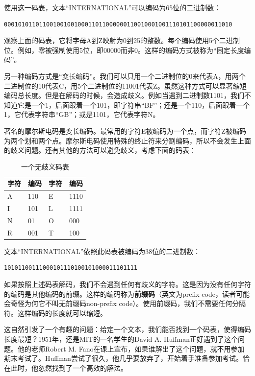 \documentclass[b5paper]{ctexart}
\begin{document}
使用这一码表，文本“INTERNATIONAL”可以编码为65位的二进制数：

\begin{Verbatim}[fontsize=\footnotesize]
00010101101100100100100011011000000110010001001110101100000011010
\end{Verbatim}

观察上面的码表，它将字母A到Z映射为0到25的整数。每个编码使用5个二进制位。例如，零被强制使用5位，即00000而非0。这样的编码方式被称为“固定长度编码”。

另一种编码方式是“变长编码”。我们可以只用一个二进制位的0来代表A，用两个二进制位的10代表C，用5个二进制位的11001代表Z。虽然这种方式可以显著缩短编码总长度。但是在解码的时候，会造成歧义。例如当遇到二进制数1101，我们不知道它是一个1，后面跟着一个101，即字符串“BF”；还是一个110，后面跟着一个1，它代表字符串“GB”；或是1101，它代表字符N。

著名的摩尔斯电码是变长编码。最常用的字符E被编码为一个点，而字符Z被编码为两个划和两个点。摩尔斯电码使用特殊的终止符来分割编码，所以不会发生上面的歧义问题。还有其他的方法可以避免歧义，考虑下面的码表：

\begin{table}[htbp]
\centering
\begin{tabular}{l|l||l|l}
字符 & 编码 & 字符 & 编码 \\
\hline
A & 110 & E & 1110 \\
I & 101 & L & 1111 \\
N & 01 & O & 000 \\
R & 001 & T & 100 \\
\hline
\end{tabular}
\caption{一个无歧义码表} \label{tab:example-prefix-code}
\end{table}

文本“INTERNATIONAL”依照此码表被编码为38位的二进制数：

\begin{Verbatim}[fontsize=\footnotesize]
10101100111000101110100101000011101111
\end{Verbatim}

如果按照上述码表解码，我们不会遇到任何有歧义的字符。这是因为没有任何字符的编码是其他编码的前缀。这样的编码称为\textbf{前缀码}（英文为prefix-code，读者可能会奇怪为何它不叫无前缀码non-prefix code）。使用前缀码，我们不需要任何分隔符。这样编码的长度就可以缩短。

这自然引发了一个有趣的问题：给定一个文本，我们能否找到一个码表，使得编码长度最短？1951年，还是MIT的一名学生的David A. Huffman正好遇到了这个问题\cite{Huffman}。他的老师Robert M. Fano在课上宣布，如果谁解出了这个问题，就不用参加期末考试了。Huffman尝试了很久，他几乎要放弃了，开始着手准备参加考试。恰在此时，他忽然找到了一个高效的解法。
\end{document}
